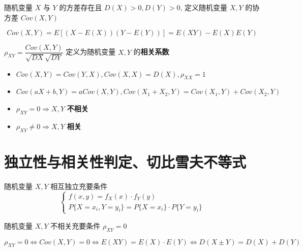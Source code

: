 \begin{definition}[协方差与相关系数]
	随机变量 $X$ 与 $Y$ 的方差存在且 $D(X) > 0, D(Y) > 0$, 定义随机变量 $X,Y$ 的协方差 $Cov(X,Y)$ 

	$$Cov(X,Y) = E[(X-E(X))(Y-E(Y))] = E(XY) - E(X)E(Y)$$
	
	$\rho_{XY} = \dfrac{Cov(X,Y)}{\sqrt{DX}\sqrt{DY}}$ 定义为随机变量 $X,Y$ 的\textbf{相关系数}
\end{definition}
\begin{corollary}[协方差和相关系数推论]
	\begin{itemize}
		\item $Cov(X,Y) = Cov(Y,X), Cov(X,X) = D(X), \rho_{XX} = 1$
		\item $Cov(aX + b,Y) = aCov(X,Y), Cov(X_{1} + X_{2},Y) = Cov(X_{1},Y) + Cov(X_{2},Y)$
		\item $\rho_{XY} = 0\Rightarrow X,Y$ \textbf{不相关}
		\item $\rho_{XY}\neq 0\Rightarrow X,Y$ \textbf{相关}
	\end{itemize}
\end{corollary}

\section{独立性与相关性判定、切比雪夫不等式}
\begin{corollary}[独立性与相关性判定]
	随机变量 $X,Y$ 相互独立充要条件
	$$\begin{cases}
		f(x,y) = f_{X}(x)\cdot f_{Y}(y)\\
		P\{X = x_{i},Y = y_{i}\} = P\{X = x_{i}\}\cdot P\{Y = y_{i}\}
	\end{cases}$$

	随机变量 $X,Y$ 不相关充要条件 $\rho_{XY} = 0$

	$$\rho_{XY} = 0\Leftrightarrow Cov(X,Y) = 0\Leftrightarrow E(XY) = E(X)\cdot E(Y)\Leftrightarrow D(X \pm Y) = D(X) + D(Y)$$
\end{corollary}


